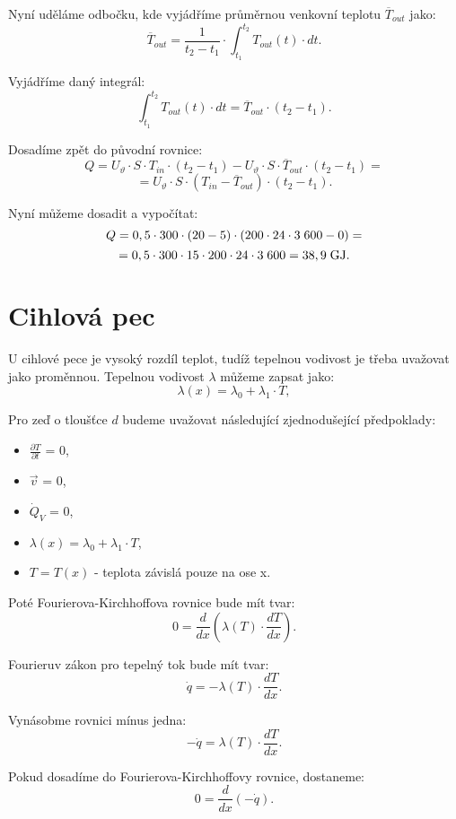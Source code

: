 \documentclass{article}
\begin{document}
Nyní uděláme odbočku, kde vyjádříme průměrnou venkovní teplotu $\overline{T}_{out}$ jako:
$$
    \overline{T}_{out} = \frac{1}{t_2 - t_1} \cdot \int_{t_1}^{t_2} T_{out} (t) \cdot dt.
$$

Vyjádříme daný integrál:
$$
    \int_{t_1}^{t_2} T_{out} (t) \cdot dt = \overline{T}_{out} \cdot (t_2 - t_1).
$$

Dosadíme zpět do původní rovnice:
$$
    Q = U_\vartheta \cdot S \cdot T_{in} \cdot (t_2 - t_1) - U_\vartheta \cdot S \cdot \overline{T}_{out} \cdot (t_2 - t_1) =
$$
$$
    = U_\vartheta \cdot S \cdot (T_{in} - \overline{T}_{out}) \cdot (t_2 - t_1).
$$

Nyní můžeme dosadit a vypočítat:
$$
    Q = 0,5 \cdot 300 \cdot (20 - 5) \cdot (200 \cdot 24 \cdot 3 \; 600 - 0) =
$$
$$
    = 0,5 \cdot 300 \cdot 15 \cdot 200 \cdot 24 \cdot 3 \; 600 = 38,9 \; \textrm{GJ}.
$$

\newpage




\section{ Cihlová pec \spicy \spicy \spicy}
U cihlové pece je vysoký rozdíl teplot, tudíž tepelnou vodivost je třeba uvažovat jako proměnnou. Tepelnou vodivost $\lambda$ můžeme zapsat jako:
$$
    \lambda (x) = \lambda_0 + \lambda_1 \cdot T,
$$

Pro zeď o tloušťce $d$ budeme uvažovat následující zjednodušející předpoklady:
\begin{itemize}
    \item $\frac{\partial T}{\partial t}$ = 0,
    \item $\vec{v}$ = 0,
    \item $\dot{Q}_V$ = 0,
    \item $\lambda (x) = \lambda_0 + \lambda_1 \cdot T$,
    \item $T = T(x)$ - teplota závislá pouze na ose x.
\end{itemize}

Poté Fourierova-Kirchhoffova rovnice bude mít tvar:
$$
    0 = \frac{d}{dx} \left ( \lambda (T) \cdot \frac{dT}{dx} \right ).
$$

Fourieruv zákon pro tepelný tok bude mít tvar:
$$
    \dot{q} = - \lambda (T) \cdot \frac{dT}{dx}.
$$

Vynásobme rovnici mínus jedna:
$$
    - \dot{q} = \lambda (T) \cdot \frac{dT}{dx}.
$$

Pokud dosadíme do Fourierova-Kirchhoffovy rovnice, dostaneme:
$$
    0 = \frac{d}{dx} \left ( - \dot{q} \right ).
$$
\end{document}
